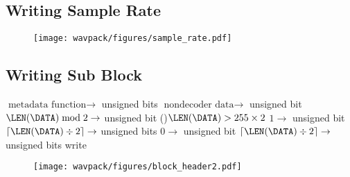 \subsection{Writing Sample Rate}
\label{wavpack:write_sample_rate}
\begin{figure}[h]
  \texttt{[image: wavpack/figures/sample\_rate.pdf]}
\end{figure}

\clearpage

\subsection{Writing Sub Block}
{
$\text{metadata function} \rightarrow$  unsigned bits\;
$\text{nondecoder data} \rightarrow$  unsigned bit\;
$\LEN(\text{\DATA}) \bmod 2 \rightarrow$  unsigned bit
\eIf(){$\LEN(\text{\DATA}) > 255 \times 2$}{
  $1 \rightarrow$  unsigned bit\;
  $\lceil\LEN(\text{\DATA}) \div 2\rceil \rightarrow$  unsigned bits\;
}{
  $0 \rightarrow$  unsigned bit\;
  $\lceil\LEN(\text{\DATA}) \div 2\rceil \rightarrow$  unsigned bits\;
}
write \DATA\;
\EALGORITHM
}

\begin{figure}[h]
\texttt{[image: wavpack/figures/block\_header2.pdf]}
\end{figure}

\clearpage

